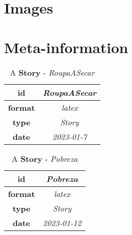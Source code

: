 \documentclass{article}
\begin{document}
\clearpage
\section{Images}



\newpage
\section{Meta-information}


    \begin{table}[ht!]
        \centering
        \begin{tabular}{|c|c|}
            \hline
            
                \textbf{ id } & \textit{ RoupaASecar } \\
                \hline
            
                \textbf{ format } & \textit{ latex } \\
                \hline
            
                \textbf{ type } & \textit{ Story } \\
                \hline
            
                \textbf{ date } & \textit{ 2023-01-7 } \\
                \hline
            
        \end{tabular}
        \caption{A \textbf{ Story }-\textit{ RoupaASecar }} %
        \label{table:\arabic{tablecounter2}} %
    \end{table}

    \begin{table}[ht!]
        \centering
        \begin{tabular}{|c|c|}
            \hline
            
                \textbf{ id } & \textit{ Pobreza } \\
                \hline
            
                \textbf{ format } & \textit{ latex } \\
                \hline
            
                \textbf{ type } & \textit{ Story } \\
                \hline
            
                \textbf{ date } & \textit{ 2023-01-12 } \\
                \hline
            
        \end{tabular}
        \caption{A \textbf{ Story }-\textit{ Pobreza }} %
        \label{table:\arabic{tablecounter2}} %
    \end{table}
\end{document}
